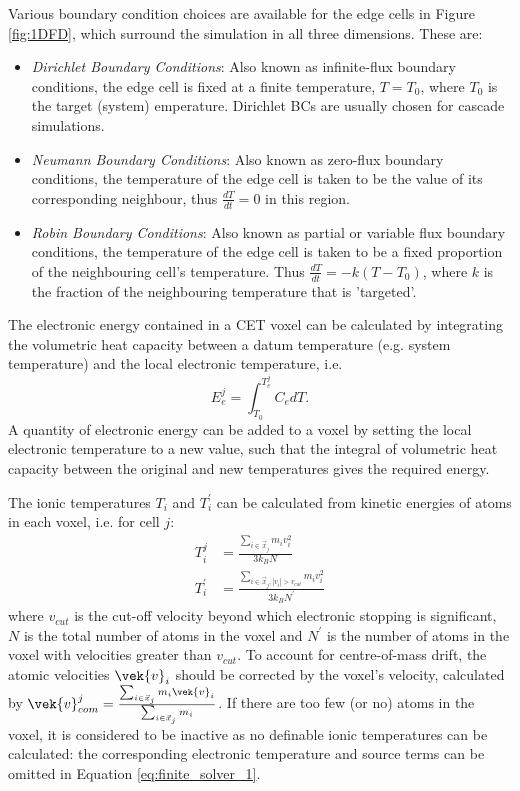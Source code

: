 Various boundary condition choices 
are available for the edge cells in Figure \ref{fig:1DFD}, which surround the 
simulation in all three dimensions. These are:
\begin{itemize}
	\item {\em Dirichlet Boundary Conditions}: Also known as 
	infinite-flux boundary conditions, the edge cell is fixed at a 
	finite temperature, $T = T_0$, where $T_0$ is the target 
	(system) emperature. Dirichlet BCs are usually chosen for 
	cascade simulations.
	
	\item {\em Neumann Boundary Conditions}: Also known as 
	zero-flux boundary conditions, the temperature of the edge 
	cell is taken to be the value of its corresponding neighbour, 
	thus $\frac{dT}{dt} = 0$ in this region.
	
	\item {\em Robin Boundary Conditions}: Also known as 
	partial or variable flux boundary conditions, the temperature 
	of the edge cell is taken to be a fixed proportion of the 
	neighbouring cell's temperature. Thus 
	$\frac{dT}{dt} = -k (T-T_0)$, where $k$ is the fraction of 
	the neighbouring temperature that is 'targeted'.
\end{itemize}

The electronic energy contained in a CET voxel can be calculated 
by integrating the volumetric heat capacity between a datum temperature 
(e.g. system temperature) and the local electronic temperature, i.e.
\begin{equation}
E_{e}^{j} = \int_{T_{0}}^{T_{e}^{j}} C_{e} dT.
\end{equation}
A quantity of electronic energy can be added to a voxel by setting the 
local electronic temperature to a new value, such that the integral of 
volumetric heat capacity between the original and new temperatures 
gives the required energy. 

The ionic temperatures $T_i$ and $T_i^{\prime}$ can be calculated 
from kinetic energies of atoms in each voxel, i.e. for cell $j$:
\begin{align}
T_{i}^{j}          &= \frac{\sum_{i \in \vec{x}_j} m_i v_i^2}{3 k_B N} \\
T_{i}^{\prime} &= \frac{\sum_{i \in \vec{x}_j, |v_i | > v_{cut}} m_i v_i^2}{3 k_B N^{\prime}}
\end{align}
where $v_{cut}$ is the cut-off velocity beyond which electronic stopping 
is significant, $N$ is the total number of atoms in the voxel and $N^{\prime}$ 
is the number of atoms in the voxel with velocities greater than $v_{cut}$. 
To account for centre-of-mass drift, the atomic velocities $\vek{v}_i$ 
should be corrected by the voxel's velocity, calculated by 
$\vek{v}^j_{com} = \frac{\sum_{i \in \vec{x}_j} m_i \vek{v}_i}{\sum_{i \in \vec{x}_j} m_i}$.
If there are too few (or no) atoms in the voxel, it is considered to be 
inactive as no definable ionic temperatures can be calculated: the 
corresponding electronic temperature and source terms can be 
omitted in Equation \ref{eq:finite_solver_1}. 


